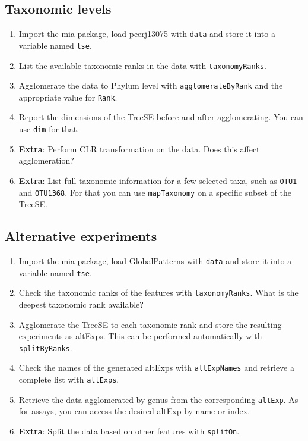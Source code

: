 \documentclass[
]{book}
\providecommand{\tightlist}{%
  \setlength{\itemsep}{0pt}\setlength{\parskip}{0pt}}
\begin{document}
\hypertarget{taxonomic-levels}{%
\subsection{Taxonomic levels}\label{taxonomic-levels}}

\begin{enumerate}
\def\labelenumi{\arabic{enumi}.}
\tightlist
\item
  Import the mia package, load peerj13075 with \texttt{data} and store it into a
  variable named \texttt{tse}.
\item
  List the available taxonomic ranks in the data with \texttt{taxonomyRanks}.
\item
  Agglomerate the data to Phylum level with \texttt{agglomerateByRank} and the
  appropriate value for \texttt{Rank}.
\item
  Report the dimensions of the TreeSE before and after agglomerating. You can
  use \texttt{dim} for that.
\item
  \textbf{Extra}: Perform CLR transformation on the data. Does this affect agglomeration?
\item
  \textbf{Extra}: List full taxonomic information for a few selected taxa, such as
  \texttt{OTU1} and \texttt{OTU1368}. For that you can use \texttt{mapTaxonomy} on a specific subset
  of the TreeSE.
\end{enumerate}

\hypertarget{alternative-experiments}{%
\subsection{Alternative experiments}\label{alternative-experiments}}

\begin{enumerate}
\def\labelenumi{\arabic{enumi}.}
\tightlist
\item
  Import the mia package, load GlobalPatterns with \texttt{data} and store it into a
  variable named \texttt{tse}.
\item
  Check the taxonomic ranks of the features with \texttt{taxonomyRanks}. What is the
  deepest taxonomic rank available?
\item
  Agglomerate the TreeSE to each taxonomic rank and store the resulting
  experiments as altExps. This can be performed automatically with \texttt{splitByRanks}.
\item
  Check the names of the generated altExps with \texttt{altExpNames} and retrieve a
  complete list with \texttt{altExps}.
\item
  Retrieve the data agglomerated by genus from the corresponding \texttt{altExp}.
  As for assays, you can access the desired altExp by name or index.
\item
  \textbf{Extra}: Split the data based on other features with \texttt{splitOn}.
\end{enumerate}
\end{document}
